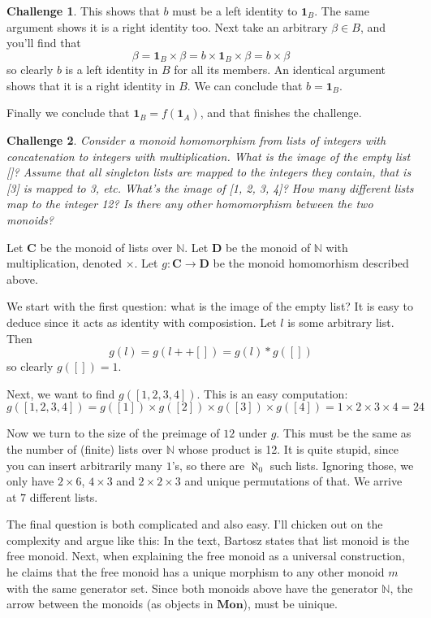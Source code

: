 \documentclass{article}
\newcommand {\cat}{%
\mathbf%
}
\newcommand {\idarrow} [ 1 ] [ ] {%
\mathbf{1}_{#1}%
}
\newcommand\nat{\mathbb{N}}
\theoremstyle{definition}
\newtheorem{ch}{Challenge}
\begin{document}
\begin{ch}
This shows that $b$ must be a left identity to $\idarrow[B]$. The same argument shows it is a right identity too. Next take an arbitrary $\beta \in B$, and you'll find that
$$ \beta = \idarrow[B] \times \beta = b \times \idarrow[B] \times \beta = b \times \beta$$
so clearly $b$ is a left identity in $B$ for all its members. An identical argument shows that it is a right identity in $B$. We can conclude that $b = \idarrow[B]$. 

Finally we conclude that $\idarrow[B] = f(\idarrow[A])$, and that finishes the challenge.





\end{ch}










\begin{ch}\textit{Consider a monoid homomorphism from lists of integers with concatenation to integers with multiplication. What is the image of the empty list []? Assume that all singleton lists are mapped to the integers they contain, that is [3] is mapped to 3, etc. What’s the image of [1, 2, 3, 4]? How many different lists map to the integer 12? Is there any other homomorphism between the two monoids?}

Let $\cat C$ be the monoid of lists over $\nat$. Let $\cat D$ be the monoid of $\nat$ with multiplication, denoted $\times$. Let $g: \cat C \to \cat D$ be the monoid homomorhism described above.

We start with the first question: what is the image of the empty list? It is easy to deduce since it acts as identity with composistion. Let $l$ is some arbitrary list. Then
$$ g(l) = g( l ++ []) = g(l) * g([])$$
so clearly $g([]) = 1$.

Next, we want to find  $g([1,2,3,4]) $. This is an easy computation:
$$g([1,2,3,4]) = g([1])\times g([2])\times g([3])\times g([4]) = 1\times 2\times 3\times 4 = 24$$

Now we turn to the size of the preimage of $12$ under $g$. This must be the same as the number of (finite) lists over $\nat$ whose product is 12. It is quite stupid, since you can insert arbitrarily many $1$'s, so there are $\aleph_0$ such lists. Ignoring those, we only have $2\times 6$, $4\times 3$ and $2\times 2\times 3$ and unique permutations of that. We arrive at $7$ different lists.

The final question is both complicated and also easy. I'll chicken out on the complexity and argue like this: In the text, Bartosz states that list monoid is the free monoid. Next, when explaining the free monoid as a universal construction, he claims that the free monoid has a unique morphism to any other monoid $m$ with the same generator set. Since both monoids above have the generator $\nat$, the arrow between the monoids (as objects in $\cat{Mon}$), must be uinique.
\end{ch}
\end{document}
